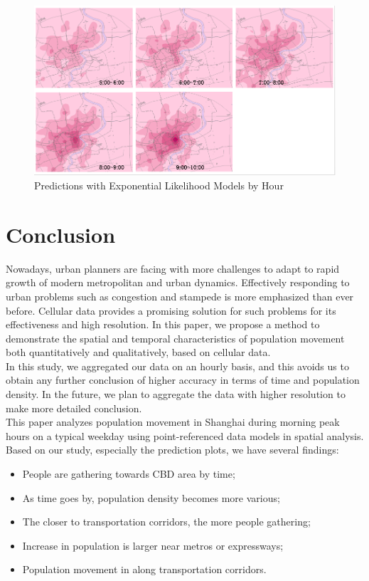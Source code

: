 \documentclass[hidelinks,12pt]{article}
\begin{document}
	 \begin{figure}[!ht]
	 	\includegraphics[width=\textwidth]{pred_exp.png}
	 	\caption{Predictions with Exponential Likelihood Models by Hour \label{fig:predexp}}
	 \end{figure}
 \FloatBarrier
 
	 

	\section{Conclusion}\label{sec:con}
	Nowadays, urban planners are facing with more challenges to adapt to rapid growth of modern metropolitan and urban dynamics. Effectively responding to urban problems such as congestion and stampede is more emphasized than ever before. Cellular data provides a promising solution for such problems for its effectiveness and high resolution. In this paper, we propose a method to demonstrate the spatial and temporal characteristics of population movement both quantitatively and qualitatively, based on cellular data.\\
	
	In this study, we aggregated our data on an hourly basis, and this avoids us to obtain any further conclusion of higher accuracy in terms of time and population density. In the future, we plan to aggregate the data with higher resolution to make more detailed conclusion.\\
	
	This paper analyzes population movement in Shanghai during morning peak hours on a typical weekday using point-referenced data models in spatial analysis. Based on our study, especially the prediction plots, we have several findings:
	\begin{itemize}
		\item People are gathering towards CBD area by time;
		\item As time goes by, population density becomes more various;
		\item The closer to transportation corridors, the more people gathering;
		\item Increase in population is larger near metros or expressways;
		\item Population movement in along transportation corridors.
	\end{itemize}
\end{document}
